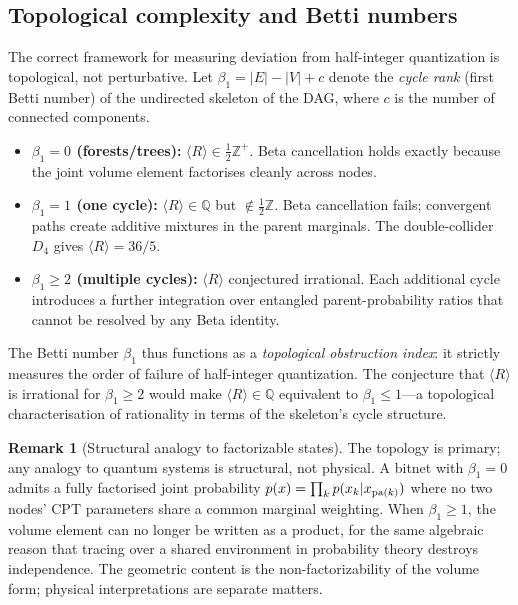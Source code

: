 \documentclass[11pt]{article}
\theoremstyle{definition}
\newtheorem{remark}[theorem]{Remark}
\begin{document}
\subsection{Topological complexity and Betti numbers}\label{sec:betti}

The correct framework for measuring deviation from half-integer 
quantization is topological, not perturbative.  Let $\beta_1 = |E|-|V|+c$ 
denote the \emph{cycle rank} (first Betti number) of the undirected 
skeleton of the DAG, where $c$ is the number of connected components.

\begin{itemize}
\item \textbf{$\beta_1 = 0$ (forests/trees):} $\langle R\rangle \in \tfrac{1}{2}\mathbb{Z}^+$.  
  Beta cancellation holds exactly because the joint volume element 
  factorises cleanly across nodes.

\item \textbf{$\beta_1 = 1$ (one cycle):} $\langle R\rangle \in \mathbb{Q}$ 
  but $\notin \tfrac{1}{2}\mathbb{Z}$.  
  Beta cancellation fails; convergent paths create additive mixtures 
  in the parent marginals.  The double-collider $D_4$ gives $\langle R\rangle = 36/5$.

\item \textbf{$\beta_1 \geq 2$ (multiple cycles):} $\langle R\rangle$ 
  conjectured irrational.  Each additional cycle introduces a further 
  integration over entangled parent-probability ratios that cannot be 
  resolved by any Beta identity.
\end{itemize}

\noindent The Betti number $\beta_1$ thus functions as a \emph{topological 
obstruction index}: it strictly measures the order of failure of 
half-integer quantization.  The conjecture that $\langle R\rangle$ is 
irrational for $\beta_1 \geq 2$ would make $\langle R\rangle \in \mathbb{Q}$ 
equivalent to $\beta_1 \leq 1$—a topological characterisation of rationality 
in terms of the skeleton's cycle structure.

\begin{remark}[Structural analogy to factorizable states]
The topology is primary; any analogy to quantum systems is structural, 
not physical.  A bitnet with $\beta_1=0$ admits a fully factorised 
joint probability $p(x) = \prod_k p(x_k | x_{{\rm pa}(k)})$ where 
no two nodes' CPT parameters share a common marginal weighting.  
When $\beta_1 \geq 1$, the volume element can no longer be written as 
a product, for the same algebraic reason that tracing over a shared 
environment in probability theory destroys independence.  
The geometric content is the non-factorizability of the volume form; 
physical interpretations are separate matters.
\end{remark}
\end{document}
